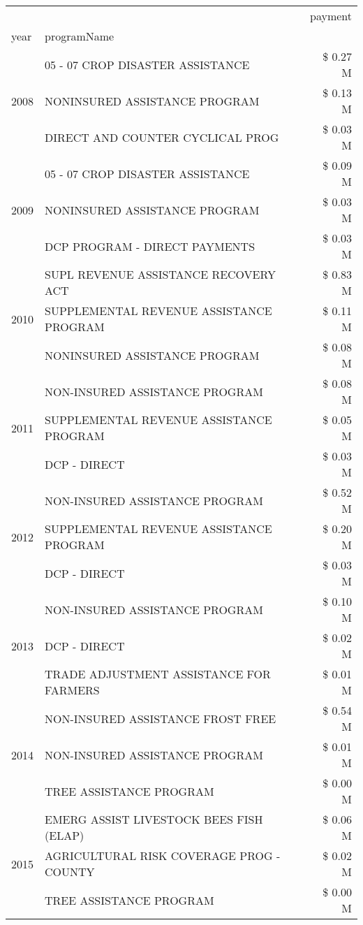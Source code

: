 \begin{tabular}{llr}
\toprule
 &  & payment \\
year & programName &  \\
\midrule
\multirow[t]{3}{*}{2008} & 05 - 07 CROP DISASTER ASSISTANCE & \$ 0.27 M \\
 & NONINSURED ASSISTANCE PROGRAM & \$ 0.13 M \\
 & DIRECT AND COUNTER CYCLICAL PROG & \$ 0.03 M \\
\cline{1-3}
\multirow[t]{3}{*}{2009} & 05 - 07 CROP DISASTER ASSISTANCE & \$ 0.09 M \\
 & NONINSURED ASSISTANCE PROGRAM & \$ 0.03 M \\
 & DCP PROGRAM - DIRECT PAYMENTS & \$ 0.03 M \\
\cline{1-3}
\multirow[t]{3}{*}{2010} & SUPL REVENUE ASSISTANCE RECOVERY ACT & \$ 0.83 M \\
 & SUPPLEMENTAL REVENUE ASSISTANCE PROGRAM & \$ 0.11 M \\
 & NONINSURED ASSISTANCE PROGRAM & \$ 0.08 M \\
\cline{1-3}
\multirow[t]{3}{*}{2011} & NON-INSURED ASSISTANCE PROGRAM & \$ 0.08 M \\
 & SUPPLEMENTAL REVENUE ASSISTANCE PROGRAM & \$ 0.05 M \\
 & DCP - DIRECT & \$ 0.03 M \\
\cline{1-3}
\multirow[t]{3}{*}{2012} & NON-INSURED ASSISTANCE PROGRAM & \$ 0.52 M \\
 & SUPPLEMENTAL REVENUE ASSISTANCE PROGRAM & \$ 0.20 M \\
 & DCP - DIRECT & \$ 0.03 M \\
\cline{1-3}
\multirow[t]{3}{*}{2013} & NON-INSURED ASSISTANCE PROGRAM & \$ 0.10 M \\
 & DCP - DIRECT & \$ 0.02 M \\
 & TRADE ADJUSTMENT ASSISTANCE FOR FARMERS & \$ 0.01 M \\
\cline{1-3}
\multirow[t]{3}{*}{2014} & NON-INSURED ASSISTANCE FROST FREE & \$ 0.54 M \\
 & NON-INSURED ASSISTANCE PROGRAM & \$ 0.01 M \\
 & TREE ASSISTANCE PROGRAM & \$ 0.00 M \\
\cline{1-3}
\multirow[t]{3}{*}{2015} & EMERG ASSIST LIVESTOCK BEES FISH (ELAP) & \$ 0.06 M \\
 & AGRICULTURAL RISK COVERAGE PROG - COUNTY & \$ 0.02 M \\
 & TREE ASSISTANCE PROGRAM & \$ 0.00 M \\

\end{tabular}
